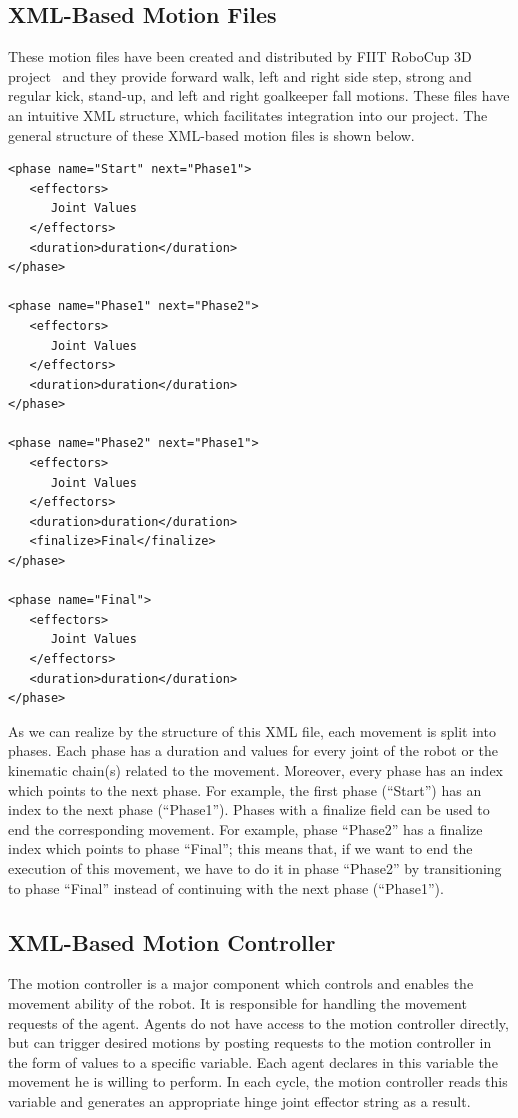 \subsection{XML-Based Motion Files}
These motion files have been created and distributed by FIIT RoboCup 3D project~\cite{} and they provide forward walk, left and right side step, strong and regular kick, stand-up, and left and right goalkeeper fall motions. These files have an intuitive XML structure, which facilitates integration into our project. The general structure of these XML-based motion files is shown below.
\begin{verbatim}
<phase name="Start" next="Phase1">
   <effectors>
      Joint Values
   </effectors>
   <duration>duration</duration>
</phase>

<phase name="Phase1" next="Phase2">
   <effectors>
      Joint Values
   </effectors>
   <duration>duration</duration>
</phase>

<phase name="Phase2" next="Phase1">
   <effectors>
      Joint Values
   </effectors>
   <duration>duration</duration>
   <finalize>Final</finalize>
</phase>

<phase name="Final">
   <effectors>
      Joint Values
   </effectors>
   <duration>duration</duration>
</phase>
\end{verbatim}
As we can realize by the structure of this XML file, each movement is split into phases. Each phase has a duration and values for every joint of the robot or the kinematic chain(s) related to the movement. Moreover, every phase has an index which points to the next phase. For example, the first phase (``Start'') has an index to the next phase (``Phase1''). Phases with a finalize field can be used to end the corresponding movement. For example, phase ``Phase2'' has a finalize index which points to phase ``Final''; this means that, if we want to end the execution of this movement, we have to do it in phase ``Phase2'' by transitioning to phase ``Final'' instead of continuing with the next phase (``Phase1'').

\subsection{XML-Based Motion Controller}

The motion controller is a major component which controls and enables the movement ability of the robot. It is responsible for handling the movement requests of the agent. Agents do not have access to the motion controller directly, but can trigger desired motions by posting requests to the motion controller in the form of values to a specific variable. Each agent declares in this variable the movement he is willing to perform. In each cycle, the motion controller reads this variable and generates an appropriate hinge joint effector string as a result.


